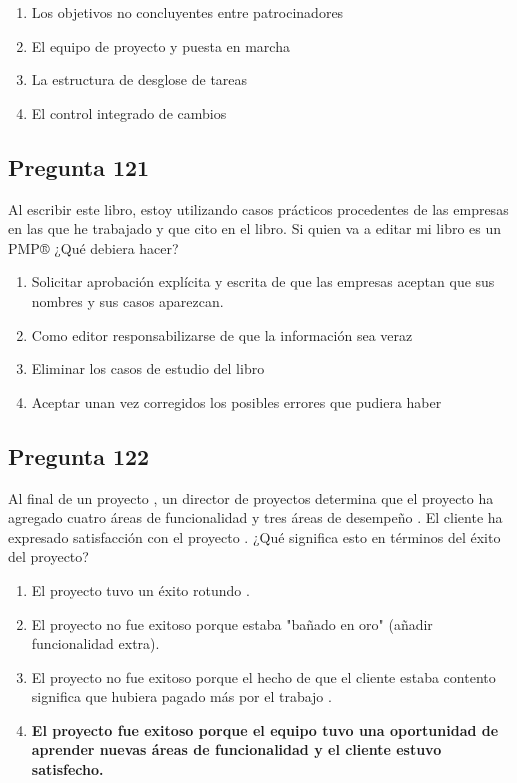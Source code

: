 \documentclass[11pt,a4paper]{article}
\begin{document}
\begin{enumerate}[label=\alph*)]
  \item Los objetivos no concluyentes entre patrocinadores
  \item El equipo de proyecto y puesta en marcha
  \item La estructura de desglose de tareas
  \item El control integrado de cambios
\end{enumerate}

\subsection*{Pregunta 121}
Al escribir este libro, estoy utilizando casos prácticos procedentes de las empresas en las que he trabajado y que cito en el libro. Si quien va a editar mi libro es un PMP® ¿Qué debiera hacer?

\begin{enumerate}[label=\alph*)]
  \item Solicitar aprobación explícita y escrita de que las empresas aceptan que sus nombres y sus casos aparezcan.
  \item Como editor responsabilizarse de que la información sea veraz
  \item Eliminar los casos de estudio del libro
  \item Aceptar unan vez corregidos los posibles errores que pudiera haber
\end{enumerate}

\subsection*{Pregunta 122}
Al final de un proyecto , un director de proyectos determina que el proyecto ha agregado cuatro áreas de funcionalidad y tres áreas de desempeño . El cliente ha expresado satisfacción con el proyecto . ¿Qué significa esto en términos del éxito del proyecto?

\begin{enumerate}[label=\alph*)]
  \item El proyecto tuvo un éxito rotundo .
  \item El proyecto no fue exitoso porque estaba "bañado en oro" (añadir funcionalidad extra).
  \item El proyecto no fue exitoso porque el hecho de que el cliente estaba contento significa que hubiera pagado más por el trabajo .
  \item \textbf{El proyecto fue exitoso porque el equipo tuvo una oportunidad de aprender nuevas áreas de funcionalidad y el cliente estuvo satisfecho.}
\end{enumerate}
\end{document}
